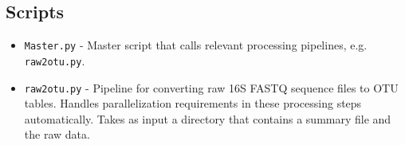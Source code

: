 \documentclass[11pt, oneside]{article}   	%
\begin{document}
\subsection{Scripts}
\begin{itemize}
	\item {\tt Master.py} - Master script that calls relevant processing pipelines, e.g. {\tt raw2otu.py}.
	\item {\tt raw2otu.py} - Pipeline for converting raw 16S FASTQ sequence files to OTU tables.  Handles parallelization requirements in these processing steps automatically.  Takes as input a directory that contains a summary file and the raw data.
\end{itemize}
\end{document}
